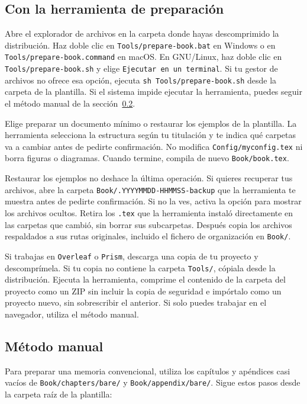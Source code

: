 \subsection{Con la herramienta de preparación}

Abre el explorador de archivos en la carpeta donde hayas descomprimido la distribución. Haz doble clic en \texttt{Tools/prepare-book.bat} en Windows o en \texttt{Tools/prepare-book.command} en macOS. En GNU/Linux, haz doble clic en \texttt{Tools/prepare-book.sh} y elige \texttt{Ejecutar en un terminal}. Si tu gestor de archivos no ofrece esa opción, ejecuta \verb|sh Tools/prepare-book.sh| desde la carpeta de la plantilla. Si el sistema impide ejecutar la herramienta, puedes seguir el método manual de la sección~\ref{sec:estructura-minima-manual}.

Elige preparar un documento mínimo o restaurar los ejemplos de la plantilla. La herramienta selecciona la estructura según tu titulación y te indica qué carpetas va a cambiar antes de pedirte confirmación. No modifica \texttt{Config/myconfig.tex} ni borra figuras o diagramas. Cuando termine, compila de nuevo \texttt{Book/book.tex}.

Restaurar los ejemplos no deshace la última operación. Si quieres recuperar tus archivos, abre la carpeta \texttt{Book/.YYYYMMDD-HHMMSS-backup} que la herramienta te muestra antes de pedirte confirmación. Si no la ves, activa la opción para mostrar los archivos ocultos. Retira los \texttt{.tex} que la herramienta instaló directamente en las carpetas que cambió, sin borrar sus subcarpetas. Después copia los archivos respaldados a sus rutas originales, incluido el fichero de organización en \texttt{Book/}.

Si trabajas en \texttt{Overleaf} o \texttt{Prism}, descarga una copia de tu proyecto y descomprímela. Si tu copia no contiene la carpeta \texttt{Tools/}, cópiala desde la distribución. Ejecuta la herramienta, comprime el contenido de la carpeta del proyecto como un ZIP sin incluir la copia de seguridad e impórtalo como un proyecto nuevo, sin sobrescribir el anterior. Si solo puedes trabajar en el navegador, utiliza el método manual.

\subsection{Método manual}
\label{sec:estructura-minima-manual}

Para preparar una memoria convencional, utiliza los capítulos y apéndices casi vacíos de \texttt{Book/chapters/bare/} y \texttt{Book/appendix/bare/}. Sigue estos pasos desde la carpeta raíz de la plantilla:

